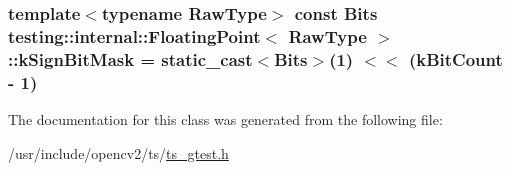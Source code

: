\hypertarget{classtesting_1_1internal_1_1FloatingPoint_aca98b5ea6f2222a66a82e52421682efa}{
\subsubsection[{k\-Sign\-Bit\-Mask}]{\setlength{\rightskip}{0pt plus 5cm}template$<$typename Raw\-Type$>$ const {\bf Bits} {\bf testing\-::internal\-::\-Floating\-Point}$<$ Raw\-Type $>$\-::k\-Sign\-Bit\-Mask = static\-\_\-cast$<${\bf Bits}$>$(1) $<$$<$ ({\bf k\-Bit\-Count} -\/ 1)\hspace{0.3cm}{\ttfamily [static]}}}\label{classtesting_1_1internal_1_1FloatingPoint_aca98b5ea6f2222a66a82e52421682efa}


The documentation for this class was generated from the following file\-:\begin{DoxyCompactItemize}
\item 
/usr/include/opencv2/ts/\hyperlink{ts__gtest_8h}{ts\-\_\-gtest.\-h}\end{DoxyCompactItemize}
